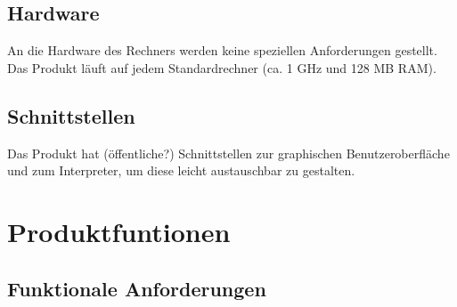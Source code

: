 \documentclass[parskip=full]{scrartcl}
\begin{document}
\subsection{Hardware}
An die Hardware des Rechners werden keine speziellen Anforderungen gestellt. Das Produkt läuft auf jedem Standardrechner (ca. 1 GHz und 128 MB RAM).

\subsection{Schnittstellen}
Das Produkt hat (öffentliche?) Schnittstellen zur graphischen Benutzeroberfläche und zum Interpreter, um diese leicht austauschbar zu gestalten.


\section{Produktfuntionen}
	\subsection{Funktionale Anforderungen}
\end{document}
